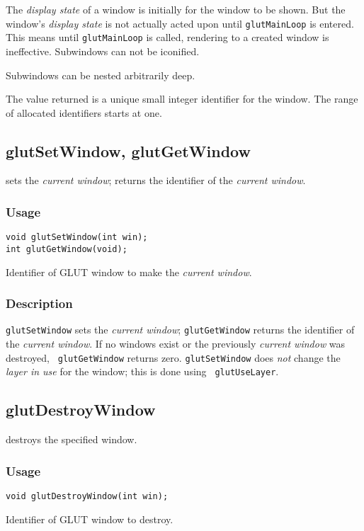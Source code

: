 The {\em display state} of a window is initially for the window
to be shown.  But the window's {\em display state} is not actually
acted upon until {\tt glutMainLoop} is entered.  This means until {\tt glutMainLoop}
is called, rendering to a created window is ineffective.
Subwindows can not be iconified.

Subwindows can be nested arbitrarily deep.

The value returned is a unique small integer identifier for the window.  The
range of allocated identifiers starts at one.

\subsection{glutSetWindow, glutGetWindow}

 sets the {\em current window}; 
returns the identifier of the {\em current window}.

\subsubsection*{Usage}
\begin{verbatim}
void glutSetWindow(int win);
int glutGetWindow(void);
\end{verbatim}
\begin{description}
\itemsep 0in
\item[{\tt win}]
Identifier of GLUT window to make the {\em current window}.
\end{description}

\subsubsection*{Description}

{\tt glutSetWindow} sets the {\em current window}; {\tt glutGetWindow}
returns the identifier of the {\em current window}.  If no windows
exist or the previously {\em current window} was destroyed, {\tt
glutGetWindow} returns zero.  {\tt glutSetWindow} does {\em not}
change the {\em layer in use} for the window; this is done using {\tt
glutUseLayer}.

\subsection{glutDestroyWindow}

 destroys the specified window.

\subsubsection*{Usage}
\begin{verbatim}
void glutDestroyWindow(int win);
\end{verbatim}
\begin{description}
\itemsep 0in
\item[{\tt win}]
Identifier of GLUT window to destroy.
\end{description}

